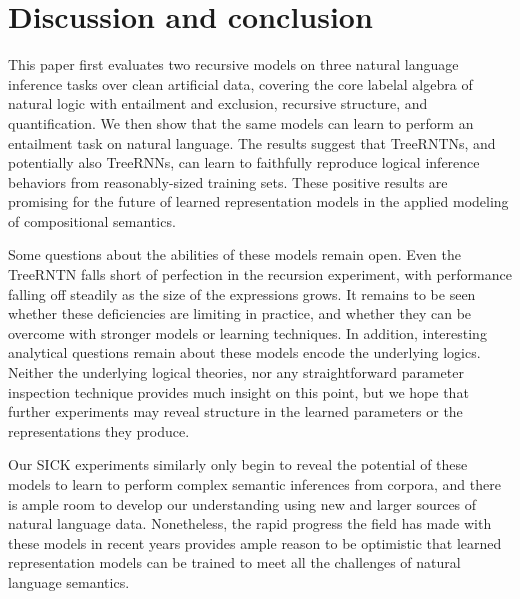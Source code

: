 \section{Discussion and conclusion}\label{sec:discussion}

This paper first evaluates two recursive models on three natural language inference 
tasks over clean artificial data, covering the 
core labelal algebra of natural logic with entailment and
exclusion, recursive structure, and quantification. 
We then show that the same models can learn to
perform an entailment task on natural language. The results suggest that TreeRNTNs,
and potentially also TreeRNNs, can learn to faithfully reproduce logical inference behaviors from
reasonably-sized training sets. These positive results are
promising for the future of learned representation models in the
applied modeling of compositional semantics.

Some questions about the abilities of these models remain open. Even
the TreeRNTN falls short of perfection in the recursion experiment, with
performance falling off steadily as the size of the expressions grows. It
remains to be seen whether these deficiencies are limiting in practice,
and whether they can be overcome with
stronger models or learning techniques. In addition, interesting 
analytical questions remain about  these models encode
the underlying logics. Neither the underlying
logical theories, nor any straightforward parameter inspection technique provides 
much insight on this point, but we hope that further experiments may reveal 
structure in the learned parameters or the representations they produce.

Our SICK experiments similarly only begin to reveal the potential of these models to learn to 
perform complex semantic inferences from corpora, and there is ample room to develop our understanding
using new and larger sources of natural language data. Nonetheless, the rapid progress the field 
has made with these models in recent years provides ample reason to be optimistic that 
learned representation models can be trained to
meet all the challenges of natural language semantics.


